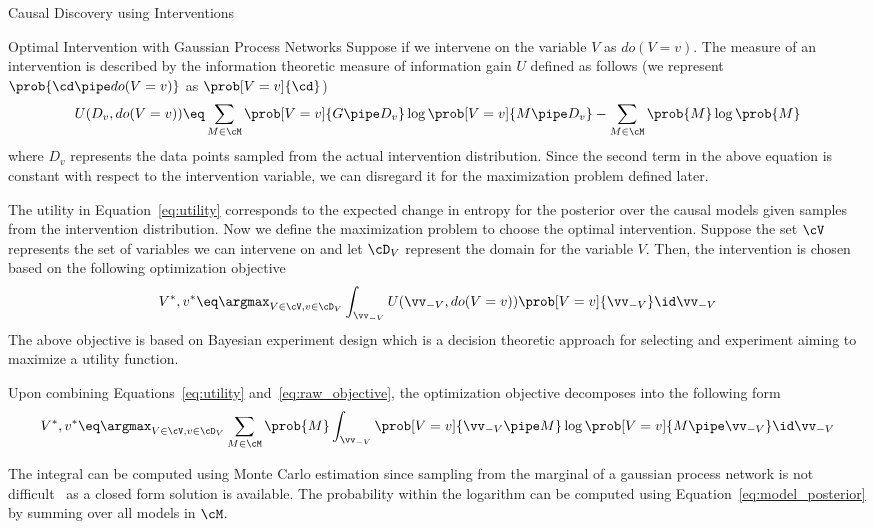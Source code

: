 \documentclass[10pt]{article}
\begin{document}
\begin{psection}[4]{Causal Discovery using Interventions}
\begin{psubsection}{Optimal Intervention with Gaussian Process Networks}
        Suppose if we intervene on the variable $V$ as $do(V = v)$. The measure of an
        intervention is described by the information theoretic measure of information
        gain $U$ defined as follows (we represent $\prob{\cd \pipe do(V = v)}$ as
        $\prob[V = v]{\cd}$)
        \begin{equation}%
            \label{eq:utility}
            U(D_v, do(V = v)) \eq \sum_{M \in \cM} \prob[V = v]{G \pipe D_v} \log{\prob[V = v]{M \pipe D_v}} - \sum_{M \in \cM} \prob{M} \log \prob{M}
        \end{equation}
        where $D_v$ represents the data points sampled from the actual intervention
        distribution. Since the second term in the above equation is constant with
        respect to the intervention variable, we can disregard it for the maximization
        problem defined later.

        The utility in Equation~\ref{eq:utility} corresponds to the expected change
        in entropy for the posterior over the causal models given samples from the
        intervention distribution. Now we define the maximization problem to choose
        the optimal intervention. Suppose the set $\cV$ represents the set of variables
        we can intervene on and let $\cD_V$ represent the domain for the variable $V$.
        Then, the intervention is chosen based on the following optimization objective
        \begin{equation}%
            \label{eq:raw_objective}
            V^\ast, v^\ast \eq \argmax_{V \in \cV, v \in \cD_V} \int_{\vv_{-V}} U(\vv_{-V}, do(V = v)) \prob[V = v]{\vv_{-V}} \id \vv_{-V}
        \end{equation}
        The above objective is based on Bayesian experiment design which is a decision
        theoretic approach for selecting and experiment aiming to maximize a utility
        function.

        Upon combining Equations~\ref{eq:utility} and~\ref{eq:raw_objective}, the
        optimization objective decomposes into the following form
        \begin{equation}%
            \label{eq:objective}
            V^\ast, v^\ast \eq \argmax_{V \in \cV, v \in \cD_V} \sum_{M \in \cM} \prob{M} \int_{\vv_{-V}} \prob[V = v]{\vv_{-V} \pipe M} \log \prob[V = v]{M \pipe \vv_{-V}} \id \vv_{-V}
        \end{equation}

        The integral can be computed using Monte Carlo estimation since sampling from
        the marginal of a gaussian process network is not
        difficult~\cite{kgelgen2019optimal} as a closed form solution is available. The
        probability within the logarithm can be computed using
        Equation~\ref{eq:model_posterior} by summing over all models in $\cM$.


\end{psubsection}
\end{psection}
\end{document}
